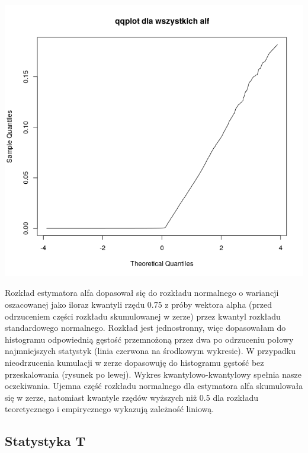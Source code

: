 \documentclass[a4paper,11pt]{article}
\begin{document}
\includegraphics[scale=.3]{Rplot12.png} 

Rozkład estymatora alfa dopasował  się do rozkładu normalnego o wariancji oszacowanej jako iloraz kwantyli rzędu 0.75 z próby wektora alpha (przed odrzuceniem części rozkładu skumulowanej w zerze) przez kwantyl rozkładu standardowego normalnego. Rozkład jest jednostronny, więc dopasowałam do histogramu odpowiednią gęstość przemnożoną przez dwa po odrzuceniu połowy najmniejszych statystyk (linia czerwona na środkowym wykresie). W przypadku nieodrzucenia kumulacji w zerze dopasowuję do histogramu gęstość bez przeskalowania (rysunek po lewej). Wykres kwantylowo-kwantylowy spełnia nasze oczekiwania. Ujemna część rozkładu normalnego dla estymatora alfa skumulowała się w zerze, natomiast kwantyle rzędów wyższych niż 0.5 dla  rozkładu teoretycznego i empirycznego wykazują zależność liniową. 


\subsection{Statystyka T}
\end{document}
